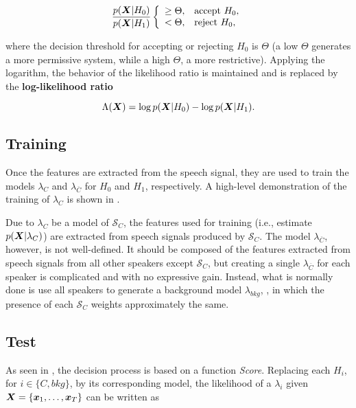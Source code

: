 \begin{equation}
    \frac{\postpdf{\dvec{X}}{H_0}}{\postpdf{\dvec{X}}{H_1}} \verifytestB{\Theta}{H_0}
    \label{eq:likelihood-ratio-test}
\end{equation}

\noindent where the decision threshold for accepting or rejecting $H_0$ is $\Theta$ (a low $\Theta$ generates a more permissive system, while a high $\Theta$, a more restrictive). Applying the logarithm, the behavior of the likelihood ratio is maintained and  is replaced by the \textbf{log-likelihood ratio}

\begin{equation}
    \Lambda(\dvec{X}) = \log \postpdf{\dvec{X}}{H_0} - \log \postpdf{\dvec{X}}{H_1}.
    \label{eq:log-likelihood-ratio-test}
\end{equation}

\subsection{Training}

Once the features are extracted from the speech signal, they are used to train the models $\lambda_{C}$ and $\lambda_{\overline{C}}$ for $H_0$ and $H_1$, respectively. A high-level demonstration of the training of $\lambda_{C}$ is shown in .

Due to $\lambda_{C}$ be a model of $\mathcal{S}_{C}$, the features used for training (i.e., estimate $p(\boldsymbol{X}|\lambda_{C})$) are extracted from speech signals produced by $\mathcal{S}_{C}$. The model $\lambda_{\overline{C}}$, however, is not well-defined. It should be composed of the features extracted from speech signals from all other speakers except $\mathcal{S}_{C}$, but creating a single $\lambda_{\overline{C}}$ for each speaker is complicated and with no expressive gain. Instead, what is normally done is use all speakers to generate a background model $\lambda_{bkg}$, , in which the presence of each $\mathcal{S}_{C}$ weights approximately the same.

\subsection{Test}

As seen in , the decision process is based on a function \emph{Score}. Replacing each $H_i$, for $i \in \{C, bkg\}$, by its corresponding model, the likelihood of a $\lambda_i$ given $\boldsymbol{X} = \{\boldsymbol{x}_1, \dots, \boldsymbol{x}_T\}$ can be written as

